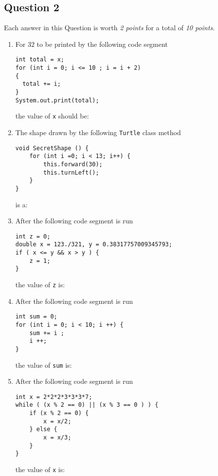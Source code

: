 \subsection*{Question 2}
Each answer in this Question is worth \emph{2 points} for a total of \emph{10 points}.
\begin{enumerate}
\item For $32$ to be printed by the following code segment
\begin{verbatim}
int total = x;
for (int i = 0; i <= 10 ; i = i + 2)
{
  total += i;
}
System.out.print(total);
\end{verbatim}
the value of \texttt{x} should be: \Ans

\item The shape drawn by the following \texttt{Turtle} class method
\begin{verbatim}
void SecretShape () {
    for (int i =0; i < 13; i++) {
        this.forward(30);
        this.turnLeft();
    }
}
\end{verbatim}
is a: \Ans

\item After the following code segment is run
\begin{verbatim}
int z = 0;
double x = 123./321, y = 0.38317757009345793;
if ( x <= y && x > y ) {
    z = 1;
}
\end{verbatim}
the value of \texttt{z} is: \Ans

\clearpage
\item After the following code segment is run
\begin{verbatim}
int sum = 0; 
for (int i = 0; i < 10; i ++) {
    sum += i ; 
    i ++;
}
\end{verbatim}
the value of \texttt{sum} is: \Ans

\item After the following code segment is run
\begin{verbatim}
int x = 2*2*2*3*3*3*7;
while ( (x % 2 == 0) || (x % 3 == 0 ) ) {
    if (x % 2 == 0) {
        x = x/2;
    } else {
        x = x/3;
    }
}
\end{verbatim}
the value of \texttt{x} is: \Ans

\end{enumerate}
\clearpage